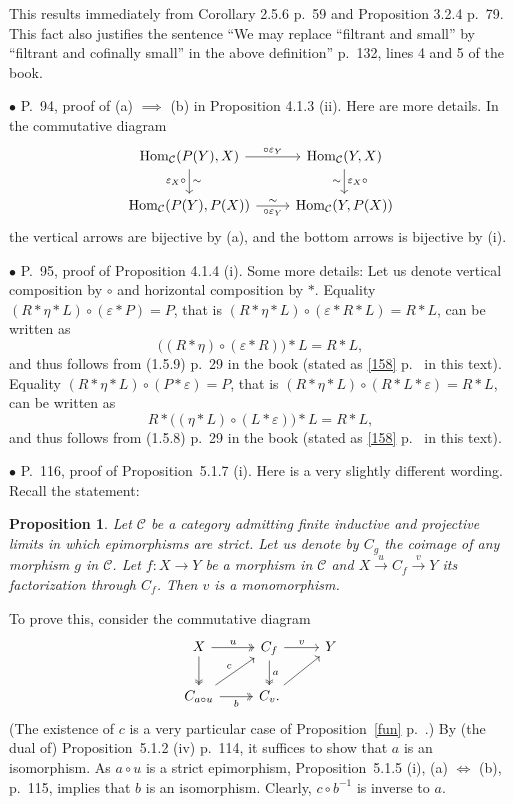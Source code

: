 \documentclass[12pt]{article}
\newtheorem{prop}[thm]{Proposition}
\theoremstyle{remark}%
\newcommand{\bu}{\bullet}
\newcommand{\n}{\noindent}
\newcommand{\C}{\mathcal C}
\newcommand{\e}{\varepsilon}
\newcommand{\pf}{\n{\em Proof. }}
\newcommand{\xr}{\xrightarrow}
\newcommand{\bp}{\begin{prop}}
\newcommand{\ep}{\end{prop}}
\newcommand{\cd}{commutative diagram}
\newcommand{\pr}{Proposition}
\DeclareMathOperator{\h}{Hom}
\begin{document}
This results immediately from Corollary 2.5.6 p.~59 and Proposition 3.2.4 p.~79. This fact also justifies the sentence ``We may replace ``filtrant and small'' by ``filtrant and cofinally small'' in the above definition'' p.~132, lines 4 and 5 of the book.%


\n$\bu$ P.~94, proof of (a) $\implies$ (b) in Proposition 4.1.3 (ii). Here are more details. In the commutative diagram 
$$
\begin{tikzcd}
\h_\C(P(Y),X)\ar{d}{\sim}[swap]{\e_X\circ}\ar{r}{\circ\e_Y}&\h_\C(Y,X)\ar{d}{\e_X\circ}[swap]{\sim}\\ 
\h_\C(P(Y),P(X))\ar{r}[swap]{\circ\e_Y}{\sim}&\h_\C(Y,P(X))
\end{tikzcd}
$$ 
the vertical arrows are bijective by (a), and the bottom arrows is bijective by (i). 


\n$\bu$ P.~95, proof of Proposition 4.1.4 (i). Some more details: Let us denote vertical composition by $\circ$ and horizontal composition by $*$. Equality $(R*\eta*L)\circ(\e*P)=P$, that is $(R*\eta*L)\circ(\e*R*L)=R*L$, can be written as 
$$
\Big((R*\eta)\circ(\e*R)\Big)*L=R*L,
$$ 
and thus follows from (1.5.9) p.~29 in the book (stated as \eqref{158} p.~\pageref{158} in this text). Equality $(R*\eta*L)\circ(P*\e)=P$, that is $(R*\eta*L)\circ(R*L*\e)=R*L$, can be written as 
$$
R*\Big((\eta*L)\circ(L*\e)\Big)*L=R*L,
$$ 
and thus follows from (1.5.8) p.~29 in the book (stated as \eqref{158} p.~\pageref{158} in this text). 


\n$\bu$ P.~116, proof of \pr\ 5.1.7 (i). Here is a very slightly different wording. Recall the statement: 
%
\bp 
Let $\C$ be a category admitting finite inductive and projective limits in which epimorphisms are strict. Let us denote by $C_g$ the coimage of any morphism $g$ in $\C$. Let $f:X\to Y$ be a morphism in $\C$ and $X\xr u C_f\xr v Y$ its factorization through $C_f$. Then $v$ is a monomorphism. 
\ep
%
\pf To prove this, consider the \cd
$$
\begin{tikzcd}
X\ar[two heads]{d}\ar[two heads]{r}{u}&C_f\ar[two heads]{d}{a}\ar{r}{v}&Y\\
C_{a\circ u}\ar{ur}{c}\ar[two heads]{r}[swap]{b}&C_v.\ar{ru}
\end{tikzcd}
$$ 
(The existence of $c$ is a very particular case of \pr\ \ref{fun} p.~\pageref{fun}.) 
By (the dual of) \pr\ 5.1.2 (iv) p.~114, it suffices to show that $a$ is an isomorphism. As $a\circ u$ is a strict epimorphism, \pr\ 5.1.5 (i), (a) $\iff$ (b), p.~115, implies that $b$ is an isomorphism. Clearly, $c\circ b^{-1}$ is inverse to $a$.  
\end{document}

